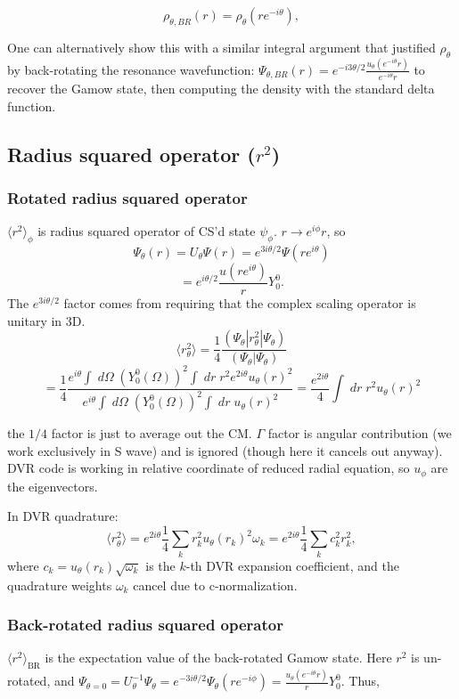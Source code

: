 $$
\rho_{\theta, BR}(r) = \rho_\theta(re^{-i\theta}),
$$

One can alternatively show this with a similar integral argument that justified $\rho_\theta$ by back-rotating the resonance wavefunction: $\Psi_{\theta,BR}(r) = e^{-i3\theta/2}\frac{u_\theta(e^{-i\theta}r)}{e^{-i\theta}r}$ to recover the Gamow state, then computing the density with the standard delta function.
\subsection{Radius squared operator ($r^2$)}
\subsubsection{Rotated radius squared operator}
$\langle r^2\rangle_\phi$ is radius squared operator of CS'd state $\psi_\phi$. $r\rightarrow e^{i\phi} r$, so
$$
\Psi_\theta(r) = U_\theta \Psi(r) = e^{3i\theta/2}\Psi(re^{i\theta})
$$
$$
= e^{i\theta/2}\frac{u(re^{i\theta})}{r}Y^0_0.
$$
The $e^{3i\theta/2}$ factor comes from requiring that the complex scaling operator is unitary in 3D.
$$
\langle r^2_\theta \rangle =\frac{1}{4}\frac{(\Psi_\theta|r^2_\theta|\Psi_\theta)}{(\Psi_\theta|\Psi_\theta)}
$$
$$
=\frac{1}{4}\frac{e^{i\theta}\int \;d\Omega\; (Y_0^0(\Omega))^2 \int\; dr \; r^2e^{2i\theta} u_\theta(r)^2}{e^{i\theta}\int \;d\Omega\; (Y^0_0(\Omega))^2\int\;dr \; u_\theta(r)^2} = \frac{e^{2i\theta}}{4} \int\;dr\; r^2 u_\theta(r)^2
$$

the $1/4$ factor is just to average out the CM. $\Gamma$ factor is angular contribution (we work exclusively in S wave) and is ignored (though here it cancels out anyway). DVR code is working in relative coordinate of reduced radial equation, so $u_\phi$ are the eigenvectors.

In DVR quadrature:
$$
\langle r^2_\theta\rangle = e^{2i\theta}\frac{1}{4}\sum_k r_k^2 u_\theta(r_k)^2 \omega_k = e^{2i\theta} \frac{1}{4} \sum_k c_k^2 r_k^2,
$$
where $c_k=u_\theta(r_k)\sqrt{\omega_k}$ is the $k$-th DVR expansion coefficient, and the quadrature weights $\omega_k$ cancel due to c-normalization.

\subsubsection{Back-rotated radius squared operator}
$\langle r^2 \rangle_{\text{BR}}$ is the expectation value of the back-rotated Gamow state. Here $r^2$ is un-rotated, and $\Psi_{\theta=0}=U_\theta^{-1}\Psi_{\theta}=e^{-3i\theta/2}\Psi_{\theta}(re^{-i\phi}) =\frac{u_\theta(e^{-i\theta} r)}{r}Y^0_0$. Thus,

